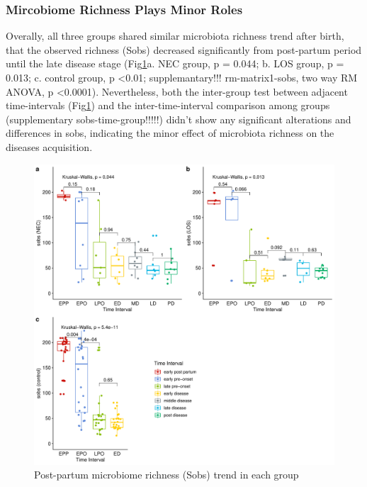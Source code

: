 \documentclass[fleqn,10pt,lineno]{wlpeerj} %
\begin{document}
    \subsubsection*{Mircobiome Richness Plays Minor Roles}
    Overally, all three groups shared similar microbiota richness trend after birth, that the observed richness (Sobs) decreased significantly from post-partum period until the late disease stage (Fig\ref{fig:sobs-group-time}a. NEC group, p = 0.044; b. LOS group, p = 0.013; c. control group, p \textless 0.01; supplemantary!!! rm-matrix1-sobs, two way RM ANOVA, p \textless 0.0001). Nevertheless, both the inter-group test between adjacent time-intervals (Fig\ref{fig:sobs-group-time}) and the inter-time-interval comparison among groups (supplementary sobs-time-group!!!!!) didn't show any significant alterations and differences in sobs, indicating the minor effect of microbiota richness on the diseases acquisition.
      \begin{figure}[ht]\centering
        \includegraphics[width=\linewidth]{figure/sobs-group-time.pdf}
        \caption{Post-partum microbiome richness (Sobs) trend in each group}
        \label{fig:sobs-group-time}
      \end{figure}
\end{document}

